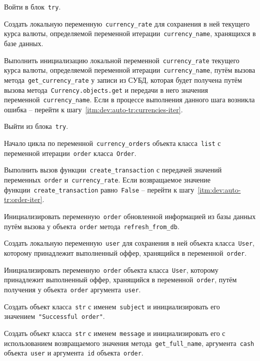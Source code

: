 \begin{enumerate_step}
    \item Войти в блок~\lstinline{try}.
    \item Создать локальную переменную~\lstinline{currency_rate} для сохранения в ней текущего курса валюты,
    определяемой переменной итерации~\lstinline{currency_name}, хранящихся в базе данных.

    \item Выполнить инициализацию локальной переменной~\lstinline{currency_rate} текущего курса валюты,
    определяемой переменной итерации~\lstinline{currency_name}, путём вызова метода~\lstinline{get_currency_rate} у записи из СУБД,
    которая будет получена путём вызова метода~\lstinline{Currency.objects.get} и передачи в него значения переменной~\lstinline{currency_name}.
    Если в процессе выполнения данного шага возникла ошибка -- перейти к шагу~\ref{itm:dev:auto-tr:currencies-iter}.
    \item Выйти из блока~\lstinline{try}.

    \item\label{itm:dev:auto-tr:order-iter} Начало цикла по переменной~\lstinline{currency_orders} объекта класса~\lstinline{list}
    с переменной итерации~\lstinline{order} класса~\lstinline{Order}.
    \item Выполнить вызов функции~\lstinline{create_transaction} с передачей значений переменных~\lstinline{order} и~\lstinline{currency_rate}.
    Если возвращаемое значение функции~\lstinline{create_transaction} равно~\lstinline{False} -- перейти к шагу~\ref{itm:dev:auto-tr:order-iter}.
    \item Инициализировать переменную~\lstinline{order} обновленной информацией из базы данных
    путём вызова у объекта~\lstinline{order} метода~\lstinline{refresh_from_db}.

    \item Создать локальную переменную~\lstinline{user} для сохранения в ней объекта класса~\lstinline{User}, которому принадлежит
    выполненный оффер, хранящийся в переменной~\lstinline{order}.
    \item Инициализировать переменную~\lstinline{order} объекта класса~\lstinline{User}, которому принадлежит выполненный оффер,
    хранящийся в переменной~\lstinline{order}, путём получения у объекта~\lstinline{order} аргумента~\lstinline{user}.
    \item Создать объект класса~\lstinline{str} с именем~\lstinline{subject} и инициализировать его значением~\lstinline{"Successful order"}.
    \item Создать объект класса~\lstinline{str} с именем~\lstinline{message} и инициализировать его с использованием возвращаемого значения
    метода~\lstinline{get_full_name}, аргумента~\lstinline{cash} объекта~\lstinline{user} и аргумента~\lstinline{id} объекта~\lstinline{order}.


\end{enumerate_step}

